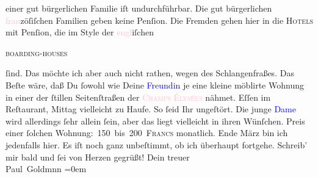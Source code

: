                einer gut bürgerlichen Familie iſt undurchführbar. Die gut bürgerlichen \textcolor{pink}{fran}{}zöſiſchen Familien geben
               keine Penſion. Die Fremden gehen hier in die \textsc{Hotels} mit
               Penſion, die im Style der \textcolor{pink}{engl}{}\ledrightnote{\textcolor{pink}{England}}iſchen \begin{otherlanguage}{english}\textsc{boarding-houses}\end{otherlanguage} ſind. Das möchte ich aber auch nicht rathen, wegen des Schlangenfraßes.
               Das Beſte wäre, daß Du ſowohl wie Deine \textcolor{blue}{Freundin}{} je eine kleine möblirte Wohnung in einer der ſtillen
               Seitenſtraßen der \textsc{\textcolor{pink}{Champs Élysées}{}\ledrightnote{\textcolor{pink}{Champs-Élysées}}} nähmet. Eſſen im Reſtaurant, \strikeout{\textcolor{gray}{×}} Mittag vielleicht zu Haufe. {\pb}So ſeid Ihr
               ungeſtört. Die junge \textcolor{blue}{Dame}{}
               wird allerdings ſehr allein ſein, aber das liegt vielleicht in ihren Wünſchen. Preis
               einer ſolchen Wohnung: 150 bis 200 \textsc{Francs} monatlich.\pend
           \pstart
            Ende März bin ich jedenfalls hier. Es iſt noch
               ganz unbeſtimmt, ob ich überhaupt fortgehe.\pend
           \pstart
           Schreib’ mir bald und ſei von Herzen gegrüßt!\pend
           \pstart
           Dein treuer {\\[\baselineskip]}\spacefill\mbox{Paul Goldmnn}\pend
           \leftskip=0em{}\endnumbering{}\begin{anhang}\end{anhang}
      